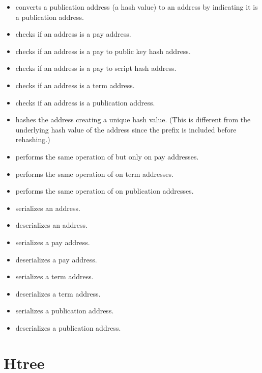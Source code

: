 \begin{itemize}
\item {} converts a publication address (a hash value) to an address by indicating it is a publication address.
\item {} checks if an address is a pay address.
\item {} checks if an address is a pay to public key hash address.
\item {} checks if an address is a pay to script hash address.
\item {} checks if an address is a term address.
\item {} checks if an address is a publication address.
\item {} hashes the address creating a unique hash value. (This is different from the underlying hash value of the address since the prefix is included before rehashing.)
\item {} performs the same operation of {} but only on pay addresses.
\item {} performs the same operation of {} on term addresses.
\item {} performs the same operation of {} on publication addresses.
\item {} serializes an address.
\item {} deserializes an address.
\item {} serializes a pay address.
\item {} deserializes a pay address.
\item {} serializes a term address.
\item {} deserializes a term address.
\item {} serializes a publication address.
\item {} deserializes a publication address.
\end{itemize}

\section{Htree}

